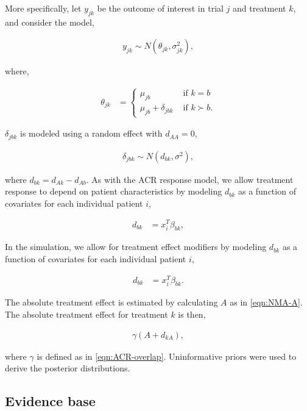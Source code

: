 \documentclass[11pt,final,fleqn]{article}
\theoremstyle{plain}
\begin{document}
\begin{appendices}
More specifically, let $y_{jk}$ be the outcome of interest in trial $j$ and treatment $k$, and consider the model,

\begin{align}
y_{jk} \sim N(\theta_{jk}, \sigma^2_{jk}),
\end{align}

where,

\begin{align}
\theta_{jk} &=
 \begin{cases}
     \mu_{jb} & \text{ if } k = b \\
     \mu_{jb} + \delta_{jbk} & \text{ if } k \succ b.
  \end{cases}
\end{align}

$\delta_{jbk}$ is modeled using a random effect with $d_{AA} =0$,

\begin{align}
\delta_{jbk} \sim N(d_{bk}, \sigma^2),
\end{align}

where $d_{bk} = d_{Ak} - d_{Ab}$. As with the ACR response model, we allow treatment response to depend on patient characteristics by modeling $d_{bk}$ as a function of covariates for each individual patient $i$,

\begin{align}
d_{bk} &= x_{i}^T\beta_{bk},
\end{align}

In the simulation, we allow for treatment effect modifiers by modeling $d_{bk}$ as a function of covariates for each individual patient $i$,

\begin{align}
d_{bk} &= x_{i}^T\beta_{bk}.
\end{align}

The absolute treatment effect is estimated by calculating $A$ as in \autoref{eqn:NMA-A}. The absolute treatment effect for treatment $k$ is then,

\begin{align}
\gamma (A + d_{kA}),
\end{align}

where $\gamma$ is defined as in \autoref{eqn:ACR-overlap}. Uninformative priors were used to derive the posterior distributions.

\subsection{Evidence base}

\end{appendices}
\end{document}
